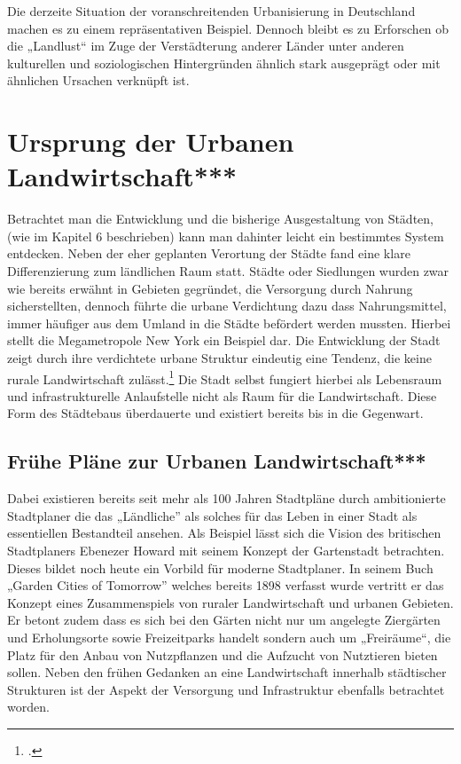 \documentclass{scrartcl}
\begin{document}
Die derzeite Situation der voranschreitenden Urbanisierung in Deutschland machen es zu einem repräsentativen Beispiel. Dennoch bleibt es zu Erforschen ob die „Landlust“ im Zuge der Verstädterung anderer Länder unter anderen kulturellen und soziologischen Hintergründen ähnlich stark ausgeprägt oder mit ähnlichen Ursachen verknüpft ist.

\section{Ursprung der Urbanen Landwirtschaft***}

Betrachtet man die Entwicklung und die bisherige Ausgestaltung von Städten, (wie im Kapitel 6 beschrieben) kann man dahinter leicht ein bestimmtes System entdecken. Neben der eher geplanten Verortung der Städte fand eine klare Differenzierung zum ländlichen Raum statt. Städte oder Siedlungen wurden zwar wie bereits erwähnt in Gebieten gegründet, die Versorgung durch Nahrung sicherstellten, dennoch führte die urbane Verdichtung dazu dass Nahrungsmittel, immer häufiger aus dem Umland in die Städte befördert werden mussten. Hierbei stellt die Megametropole New York ein Beispiel dar. Die Entwicklung der Stadt zeigt durch ihre verdichtete urbane Struktur eindeutig eine Tendenz, die keine rurale Landwirtschaft zulässt.\footcite[Vgl.][S. 146]{} Die Stadt selbst fungiert hierbei als Lebensraum und infrastrukturelle Anlaufstelle nicht als Raum für die Landwirtschaft. Diese Form des Städtebaus überdauerte und existiert bereits bis in die Gegenwart.

\subsection{Frühe Pläne zur Urbanen Landwirtschaft***}
Dabei existieren bereits seit mehr als 100 Jahren Stadtpläne durch ambitionierte Stadtplaner die das „Ländliche” als solches für das Leben in einer Stadt als essentiellen Bestandteil ansehen. Als Beispiel lässt sich die Vision des britischen Stadtplaners Ebenezer Howard mit seinem Konzept der Gartenstadt betrachten. Dieses bildet noch heute ein Vorbild für moderne Stadtplaner. In seinem Buch „Garden Cities of Tomorrow” welches bereits 1898 verfasst wurde vertritt er das Konzept eines Zusammenspiels von ruraler Landwirtschaft und urbanen Gebieten. Er betont zudem dass es sich bei den Gärten nicht nur um angelegte Ziergärten und Erholungsorte sowie Freizeitparks handelt sondern auch um „Freiräume“, die Platz für den Anbau von Nutzpflanzen und die Aufzucht von Nutztieren bieten sollen. Neben den frühen Gedanken an eine Landwirtschaft innerhalb städtischer Strukturen ist der Aspekt der Versorgung und Infrastruktur ebenfalls betrachtet worden.
\end{document}
